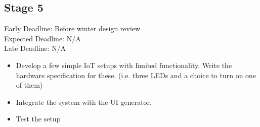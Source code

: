 \documentclass{article}
\begin{document}
\subsection{Stage 5}
Early Deadline: Before winter design review \\
Expected Deadline: N/A \\
Late Deadline: N/A \\
\begin{itemize}
\item Develop a few simple IoT setups with limited functionality. Write the hardware specification for these. (i.e. three LEDs and a choice to turn on one of them)
\item Integrate the system with the UI generator.
\item Test the setup
\end{itemize}
\end{document}
